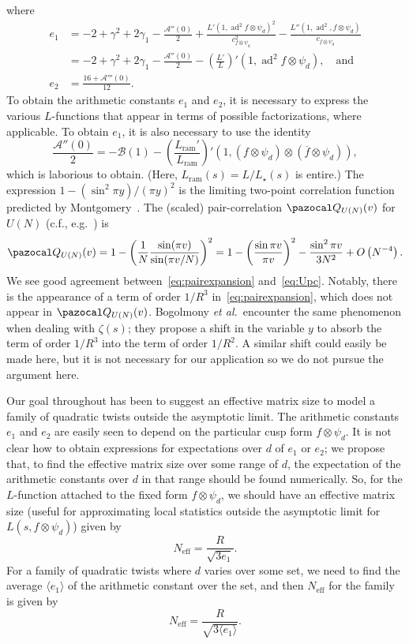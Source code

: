 \documentclass[11pt,reqno]{amsart} \usepackage{fullpage}
\newcommand\be{\begin{equation}}
\newcommand\ee{\end{equation}}
\newcommand{\etal}{\textit{et al.}}
\newcommand{\neff}{N_{\text{eff}}}
\DeclareMathOperator{\ad}{ad}
\newcommand{\Lunram}{L_{\star}}
\newcommand{\Lram}{L_{\text{ram}}}
\numberwithin{equation}{section}
\begin{document}
where \begin{align}\label{eq:a1pc}
e_1&=-2+\gamma^2+2\gamma_1-\frac{\mathcal A''(0)}{2}
+\frac{L'(1,\ad^2f\otimes\psi_d)^2}{c_{f\otimes\psi_d}^2}
     -\frac{L''(1,\ad^2,f\otimes\psi_d)}{c_{f\otimes\psi_d}} \\
   &=-2+\gamma^2+2\gamma_1-\frac{\mathcal A''(0)}{2}
     -\left(\frac{L'}{L}\right)'(1,\ad^2 f\otimes\psi_d),\quad\text{and} \\ \label{eq:a2pc}
        e_2&=\frac{16+\mathcal A'''(0)}{12}.\end{align}
To obtain the arithmetic constants $e_1$ and $e_2$, it is necessary to express the various
$L$-functions that appear in terms of possible factorizations, where applicable.
To obtain $e_1$, it is also necessary to use the identity
\be\frac{\mathcal A''(0)}{2}=-\mathcal B(1)-\left(\frac{\Lram'}{\Lram}\right)'
\left(1,(f\otimes\psi_d)\otimes(\overline f\otimes\psi_d)\right),\ee
which is laborious to obtain.
(Here, $\Lram(s)=L/\Lunram(s)$ is entire.)
The expression $1-(\sin^2\pi y)/(\pi y)^2$ is the limiting two-point correlation function
predicted by Montgomery~\cite{montgomery}.
The (scaled) pair-correlation $\pazocal Q_{U(N)}(v)$ for $U(N)$
(c.f., e.g.~\cite{conreymatrix}) is \be\label{eq:Upc}
\pazocal Q_{U(N)}(v)=1-\left(\frac1 N\frac{\sin(\pi v)}{\sin(\pi v/N)}\right)^2
=1-\left(\frac{\sin\pi v}{\pi v}\right)^2-\frac{\sin^2\pi v}{3N^2}+O\left(N^{-4}\right).\ee
We see good agreement between~\eqref{eq:pairexpansion} and~\eqref{eq:Upc}.
Notably, there is the appearance of a term of order $1/R^3$ in~\eqref{eq:pairexpansion},
which does not appear in $\pazocal Q_{U(N)}(v)$. Bogolmony \etal\ encounter the same
phenomenon when dealing with $\zeta(s)$; they propose a shift in the variable $y$ to absorb
the term of order $1/R^3$ into the term of order $1/R^2$. A similar shift could easily be
made here, but it is not necessary for our application so we do not pursue the argument
here.

Our goal throughout has been to suggest an effective matrix size to model a family of
quadratic twists outside the asymptotic limit. The arithmetic constants $e_1$ and $e_2$ are
easily seen to depend on the particular cusp form $f\otimes\psi_d$.
It is not clear how to obtain expressions for expectations over $d$ of $e_1$ or $e_2$; we
propose that, to find the effective matrix size over some range of $d$, the expectation of
the arithmetic constants over $d$ in that range should be found numerically.
So, for the $L$-function attached to the fixed form $f\otimes\psi_d$, we should have an
effective matrix size (useful for approximating local statistics outside the asymptotic
limit for $L(s,f\otimes\psi_d)$) given by \be\neff=\frac R{\sqrt{3e_1}}.\ee
For a family of quadratic twists where $d$ varies over some set, we need to find the
average $\langle e_1\rangle$ of the arithmetic constant over the set, and then $\neff$ for
the family is given by \be\neff=\frac R{\sqrt{3\langle e_1\rangle}}.\ee
\end{document}
